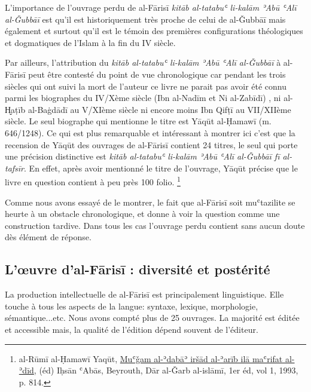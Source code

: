\documentclass[a4paper,12pt]{report}
\begin{document}
\begin{itemize}
L’importance  de l’ouvrage perdu de al-Fārisī  \textit{kitāb al-tatabuʿ li-kalām ʾAbū ʿAlī al-Ǧubbāī } est qu’il est historiquement très proche de celui de  al-Ǧubbāī  mais également et surtout  qu’il est le témoin des premières configurations théologiques et dogmatiques de l’Islam à la fin du IV siècle. 

Par ailleurs, l’attribution  du  \textit{kitāb al-tatabuʿ li-kalām ʾAbū ʿAlī al-Ǧubbāī} à al-Fārisī peut être contesté du point de vue chronologique car  pendant les trois siècles qui ont suivi la mort de l’auteur ce livre ne parait pas avoir été connu parmi les biographes du IV/Xème siècle  (Ibn al-Nadīm et Ni al-Zab\=idī)  , ni al-H̬aṭīb al-Baġdādī  au V/XIème siècle  ni encore moins Ibn Qifṭī au VII/XIIème siècle.  Le seul biographe qui mentionne le titre est Yāqūt al-Ḥamawī  (m. 646/1248). Ce qui est plus remarquable et intéressant à montrer ici c’est  que  la recension de Yāqūt des ouvrages de al-Fārisī  contient 24 titres, le seul qui porte une précision distinctive est \textit{ kitāb al-tatabuʿ li-kalām ʾAbū ʿAlī al-Ǧubbāī fī al-tafsīr}. En effet, après avoir mentionné le titre de l’ouvrage, Yāqūt  précise que le livre en question contient à peu près 100 folio. 
\footnote{al-Rūmī al-Ḥamawī Yaqūt, \underline {Muʿǧam al-ʾdabāʾ iršād al-ʾarīb ilā maʿrifat al-ʾdīd}, (éd) Iḥsān ʿAbās, Beyrouth, Dār al-Ǧarb al-islāmī, 1er éd, vol 1, 1993, p. 814.} 

\begin{Arabic}
\end{Arabic}

Comme nous avons essayé de le montrer, le fait que al-Fārisī soit muʿtazilite se heurte à un obstacle chronologique, et donne à voir  la question comme une construction tardive. Dans tous les cas  l'ouvrage perdu contient sans aucun doute dès élément de réponse. 



\newpage
\subsection{L’œuvre d'al-Fārisī : diversité et postérité}

La production intellectuelle de al-Fāris\=i est principalement linguistique. Elle touche à tous les aspects de la langue:  syntaxe, lexique,  morphologie, sémantique...etc. Nous avons compté plus de 25 ouvrages. La majorité est éditée et accessible mais, la qualité de l'édition  dépend  souvent de l'éditeur. 


\end{itemize}
\end{document}
